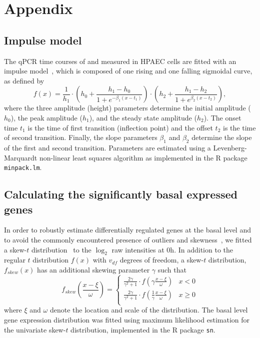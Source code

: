\chapter{Appendix}

\section{Impulse model}
The qPCR time courses of \tnfa and \sdfonea measured in HPAEC cells are fitted with an impulse model~\cite{Chechik2009}, which is composed of one rising and one falling sigmoidal curve, as defined by
\[
f(x) = \frac{1}{h_1} \cdot \left(h_0+\frac{h_1-h_0}{1+e^{-\beta_1(x-t_1)}}\right) \cdot
\left(h_2+\frac{h_1-h_2}{1+e^{\beta_2(x-t_2)}}\right), 
\]
where the three amplitude (height) parameters determine the initial amplitude 
($h_0$), the peak amplitude
($h_1$), and the steady state amplitude ($h_2$). The onset time $t_1$ is the time of  first transition (inflection point) and the offset $t_2$ is the time of second  transition. Finally, the slope parameters $\beta_1$ and $\beta_2$ determine the slope of the first and second transition. Parameters are estimated using a  Levenberg-Marquardt non-linear least squares  algorithm as implemented in the R package \texttt{minpack.lm}.

\section{Calculating the significantly basal expressed genes}
In order to robustly estimate differentially regulated genes at the basal level and to avoid the commonly encountered 
presence of outliers and skewness~\cite{Marko2011}, we fitted 
a skew-$t$  distribution~\cite{Azzalini2003} to the $\log_2$ raw intensities at 0h. 
In addition to the regular $t$ distribution $f(x)$ with $v_{df}$ degrees of freedom, a skew-$t$ distribution,  $f_{skew}(x)$ has an additional 
skewing parameter $\gamma$ such that  
\[
f_{skew}\left(\frac{x-\xi}{\omega}\right) = 
\begin{cases}
\frac{2\gamma}{\gamma^2+1} \cdot f\left(\gamma\frac{x-\xi}{\omega}\right) & x<0\\
\frac{2\gamma}{\gamma^2+1} \cdot f\left(\frac{1}{\gamma}\frac{x-\xi}{\omega}\right) & x \geqslant 0\\
\end{cases}
\]
where $\xi$  and  $\omega$ denote the location and scale of the distribution.  
The basal level gene expression distribution was fitted using maximum likelihood 
estimation for the 
univariate skew-$t$ distribution, implemented in the R package \texttt{sn}.

